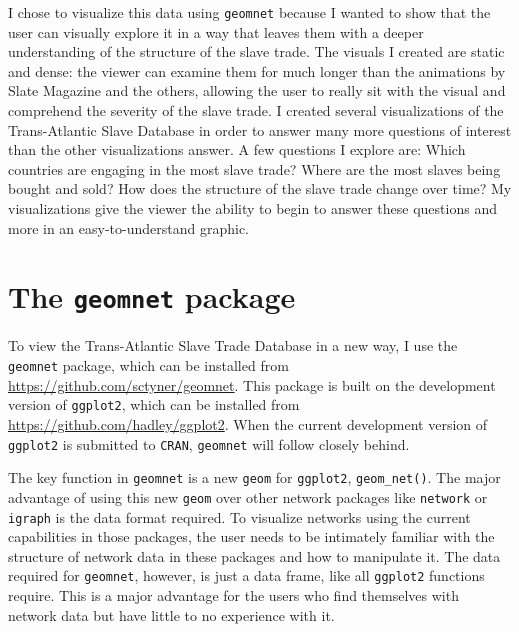 \documentclass[DIV=calc, paper=a4, fontsize=10pt, twocolumn]{scrartcl}\usepackage[]{graphicx}\usepackage[]{color}
\begin{document}
\par I chose to visualize this data using \texttt{geomnet} because I wanted to show that the user can visually explore it in a way that leaves them with a deeper understanding of the structure of the slave trade. The visuals I created are static and dense: the viewer can examine them for much longer than the animations by Slate Magazine and the others, allowing the user to really sit with the visual and comprehend the severity of the slave trade. I created several visualizations of the Trans-Atlantic Slave Database in order to answer many more questions of interest than the other visualizations answer. A few questions I explore are: Which countries are engaging in the most slave trade? Where are the most slaves being bought and sold? How does the structure of the slave trade change over time? My visualizations give the viewer the ability to begin to answer these questions and more in an easy-to-understand graphic.  

\section*{The \texttt{geomnet} package}

\par To view the Trans-Atlantic Slave Trade Database in a new way, I use the \texttt{geomnet} package, which can be installed from \url{https://github.com/sctyner/geomnet}.  This package is built on the development version of \texttt{ggplot2}, which can be installed from \url{https://github.com/hadley/ggplot2}.  When the current development version of \texttt{ggplot2} is submitted to \texttt{CRAN}, \texttt{geomnet} will follow closely behind. 

\par The key function in \texttt{geomnet} is a new \texttt{geom} for \texttt{ggplot2}, \texttt{geom\_net()}.  The major advantage of using this new \texttt{geom} over other network packages like \texttt{network} or \texttt{igraph} is the data format required.%
To visualize networks using the current capabilities in those packages, the user needs to be intimately familiar with the structure of network data in these packages and how to manipulate it. The data required for \texttt{geomnet}, however, is just a data frame, like all \texttt{ggplot2} functions require. This is a major advantage for the users who find themselves with network data but have little to no experience with it. 
\end{document}
